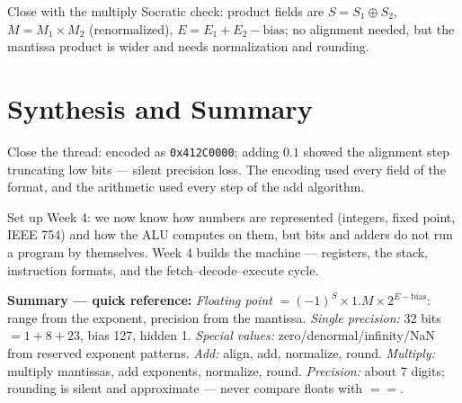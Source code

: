 \documentclass[11pt]{article}
\begin{document}
Close with the multiply Socratic check: product fields are $S = S_1 \oplus S_2$, $M = M_1 \times M_2$ (renormalized), $E = E_1 + E_2 - \text{bias}$; no alignment needed, but the mantissa product is wider and needs normalization and rounding.

\section{Synthesis and Summary}

Close the thread:  encoded as \texttt{0x412C0000}; adding $0.1$ showed the alignment step truncating low bits --- silent precision loss. The encoding used every field of the format, and the arithmetic used every step of the add algorithm.

Set up Week 4: we now know how numbers are represented (integers, fixed point, IEEE 754) and how the ALU computes on them, but bits and adders do not run a program by themselves. Week 4 builds the machine --- registers, the stack, instruction formats, and the fetch--decode--execute cycle.

\textbf{Summary --- quick reference:} \emph{Floating point} $= (-1)^S \times 1.M \times 2^{E-\text{bias}}$: range from the exponent, precision from the mantissa. \emph{Single precision:} 32 bits $= 1+8+23$, bias 127, hidden 1. \emph{Special values:} zero/denormal/infinity/NaN from reserved exponent patterns. \emph{Add:} align, add, normalize, round. \emph{Multiply:} multiply mantissas, add exponents, normalize, round. \emph{Precision:} about 7 digits; rounding is silent and approximate --- never compare floats with $==$.



\end{document}
